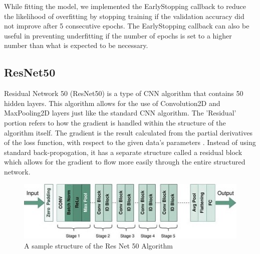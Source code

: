 While fitting the model, we implemented the EarlyStopping callback to reduce the likelihood of overfitting by stopping training if the validation accuracy did not improve after 5 consecutive epochs. 
The EarlyStopping callback can also be useful in preventing underfitting if the number of epochs is set to a higher number than what is expected to be necessary. 

\subsection{ResNet50}

Residual Network 50 (ResNet50) is a type of CNN algorithm that contains 50 hidden layers. 
This algorithm allows for the use of Convolution2D and MaxPooling2D layers just like the standard CNN algorithm.
The 'Residual' portion refers to how the gradient is handled within the structure of the algorithm itself.
The gradient is the result calculated from the partial derivatives of the loss function, with respect to the given data's parameters \cite{Gradient}.
Instead of using standard back-propogation, it has a separate structure called a residual block which allows for the gradient to flow more easily through the entire structured network\cite{RN50}.

\begin{figure}[h]
	\centering
	\includegraphics[scale=0.5]{ResNet_structure.jpg}
	\caption{A sample structure of the Res Net 50 Algorithm}
	\label{fig:figure4}
\end{figure}

\newpage

